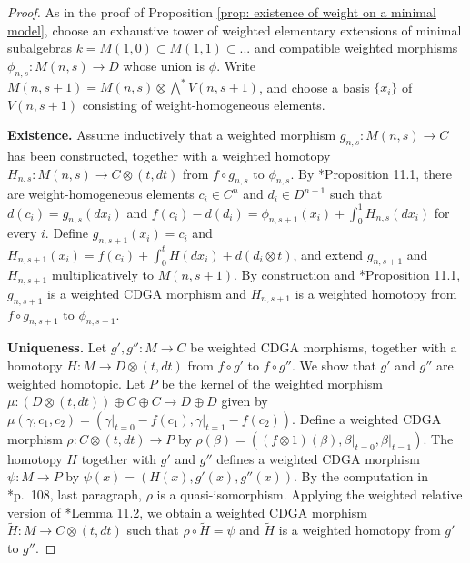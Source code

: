 \documentclass[11pt]{amsart}
\theoremstyle{definition}
\numberwithin{equation}{section}
\numberwithin{equation}{section}
\begin{document}
\begin{proof}
As in the proof of Proposition \ref{prop: existence of weight on a minimal model}, choose an exhaustive tower of weighted elementary extensions of minimal subalgebras $k=M(1,0)\subset M(1,1)\subset ...$ and compatible weighted morphisms $\phi_{n,s}:M(n,s)\rightarrow D$ whose union is $\phi$. Write $M(n,s+1)=M(n,s)\otimes \bigwedge^* V(n,s+1)$, and choose a basis $\{x_i\}$ of $V(n,s+1)$ consisting of weight-homogeneous elements.

\textbf{Existence.} Assume inductively that a weighted morphism $g_{n,s}:M(n,s)\rightarrow C$ has been constructed, together with a weighted homotopy $H_{n,s}:M(n,s)\rightarrow C\otimes (t,dt)$ from $f\circ g_{n,s}$ to $\phi_{n,s}$. By \cite{MGriffiths-Morgan-rational-homotopy}*{Proposition 11.1}, there are weight-homogeneous elements $c_i\in C^{n}$ and $d_i\in D^{n-1}$ such that $d(c_i)=g_{n,s}(dx_i)$ and $f(c_i)-d(d_i)=\phi_{n,s+1}(x_i)+\int^{1}_0 H_{n,s}(dx_i)$ for every $i$. Define $g_{n,s+1}(x_i)=c_i$ and $H_{n,s+1}(x_i)=f(c_i)+\int^t_0 H(dx_i)+d(d_i\otimes t)$, and extend $g_{n,s+1}$ and $H_{n,s+1}$ multiplicatively to $M(n,s+1)$. By construction and \cite{MGriffiths-Morgan-rational-homotopy}*{Proposition 11.1}, $g_{n,s+1}$ is a weighted CDGA morphism and $H_{n,s+1}$ is a weighted homotopy from $f\circ g_{n,s+1}$ to $\phi_{n,s+1}$.

\textbf{Uniqueness.} Let $g',g'':M\rightarrow C$ be weighted CDGA morphisms, together with a homotopy $H:M\rightarrow D\otimes (t,dt)$ from $f\circ g'$ to $f\circ g''$. We show that $g'$ and $g''$ are weighted homotopic. Let $P$ be the kernel of the weighted morphism $\mu: (D\otimes (t,dt))\oplus C\oplus C\rightarrow D\oplus D$ given by $\mu(\gamma,c_1,c_2)=(\gamma\vert_{t=0}-f(c_1),\gamma\vert_{t=1}-f(c_2))$. Define a weighted CDGA morphism $\rho:C\otimes (t,dt)\rightarrow P$ by $\rho(\beta)=((f\otimes 1)(\beta),\beta\vert_{t=0},\beta\vert_{t=1})$. The homotopy $H$ together with $g'$ and $g''$ defines a weighted CDGA morphism $\psi:M\rightarrow P$ by $\psi(x)=(H(x),g'(x),g''(x))$. By the computation in \cite{MGriffiths-Morgan-rational-homotopy}*{p.~108, last paragraph}, $\rho$ is a quasi-isomorphism. Applying the weighted relative version of \cite{MGriffiths-Morgan-rational-homotopy}*{Lemma 11.2}, we obtain a weighted CDGA morphism $\widetilde{H}:M\rightarrow C\otimes (t,dt)$ such that $\rho\circ \widetilde{H}=\psi$ and $\widetilde{H}$ is a weighted homotopy from $g'$ to $g''$.
\end{proof}
\end{document}
